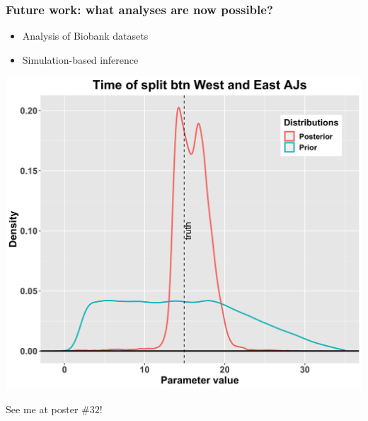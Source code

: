\documentclass[11pt, mathserif, aspectratio=169]{beamer}
\begin{document}
\begin{frame}
\frametitle{Future work: what analyses are now possible?}
\begin{minipage}{.55\linewidth}
\flushleft
\begin{center}
\begin{itemize}
\item Analysis of Biobank datasets
\item Simulation-based inference\\
\end{itemize}
\vspace{5mm}
\includegraphics[scale=.06]{pics/abc-ibd-4.png}
\end{center}
\end{minipage}\begin{minipage}{.4\linewidth}
\centering
See me at poster $\# 32$!


\end{minipage}
\end{frame}
\end{document}
